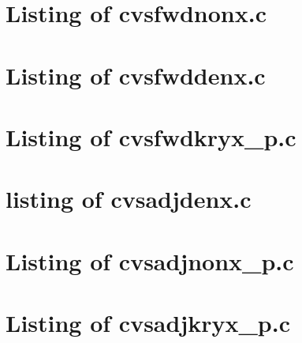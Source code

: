 
\newpage
\section{Listing of cvsfwdnonx.c}\label{s:cvsfwdnonx_c}

\newpage
\section{Listing of cvsfwddenx.c}\label{s:cvsfwddenx_c}

\newpage
\section{Listing of cvsfwdkryx\_p.c}\label{s:cvsfwdkryx_p_c}


\newpage
\section{listing of cvsadjdenx.c}\label{s:cvsadjdenx_c}

\newpage
\section{Listing of cvsadjnonx\_p.c}\label{s:cvsadjnonx_p_c}

\newpage
\section{Listing of cvsadjkryx\_p.c}\label{s:cvsadjkryx_p_c}
